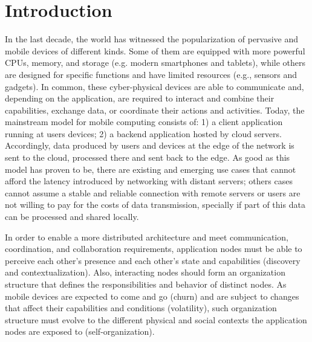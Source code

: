 \section{Introduction}
\label{sec:intro}


In the last decade, the world has witnessed the popularization of pervasive and mobile devices of different kinds. Some of them are equipped with more powerful CPUs, memory, and storage (e.g. modern smartphones and tablets), while others are designed for specific functions and have limited resources (e.g., sensors and gadgets). In common, these cyber-physical devices are able to communicate and, depending on the application, are required to interact and combine their capabilities, exchange data, or coordinate their actions and activities. Today, the mainstream model for mobile computing consists of: 1) a client application running at users devices; 2) a backend application hosted by cloud servers. Accordingly, data produced by users and devices at the edge of the network is sent to the cloud, processed there and sent back to the edge. As good as this model has proven to be, there are existing and emerging use cases that cannot afford the latency introduced by networking with distant servers; others cases cannot assume a stable and reliable connection with remote servers or users are not willing to pay for the costs of data transmission, specially if part of this data can be processed and shared locally. 



In order to enable a more distributed architecture and meet communication, coordination, and collaboration requirements, application nodes must be able to perceive each other's presence and each other's state and capabilities (discovery and contextualization). Also, interacting nodes should form an organization structure that defines the responsibilities and behavior of distinct nodes. As mobile devices are expected to come and go (churn) and are subject to changes that affect their capabilities and conditions (volatility), such organization structure must evolve to the different physical and social contexts the application nodes are exposed to (self-organization). 

